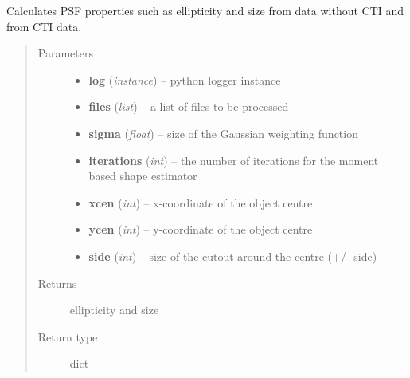 \documentclass[a4paper,11pt,english]{sphinxmanual}
\begin{document}

\begin{fulllineitems}
\label{reduction:analysis.testCTIcorrection.testCTIcorrection}
Calculates PSF properties such as ellipticity and size from data without CTI and from
CTI data.
\begin{quote}\begin{description}
\item[{Parameters}] \leavevmode\begin{itemize}
\item {} 
\textbf{log} (\emph{instance}) -- python logger instance

\item {} 
\textbf{files} (\emph{list}) -- a list of files to be processed

\item {} 
\textbf{sigma} (\emph{float}) -- size of the Gaussian weighting function

\item {} 
\textbf{iterations} (\emph{int}) -- the number of iterations for the moment based shape estimator

\item {} 
\textbf{xcen} (\emph{int}) -- x-coordinate of the object centre

\item {} 
\textbf{ycen} (\emph{int}) -- y-coordinate of the object centre

\item {} 
\textbf{side} (\emph{int}) -- size of the cutout around the centre (+/- side)

\end{itemize}

\item[{Returns}] \leavevmode
ellipticity and size

\item[{Return type}] \leavevmode
dict

\end{description}\end{quote}

\end{fulllineitems}

\end{document}
